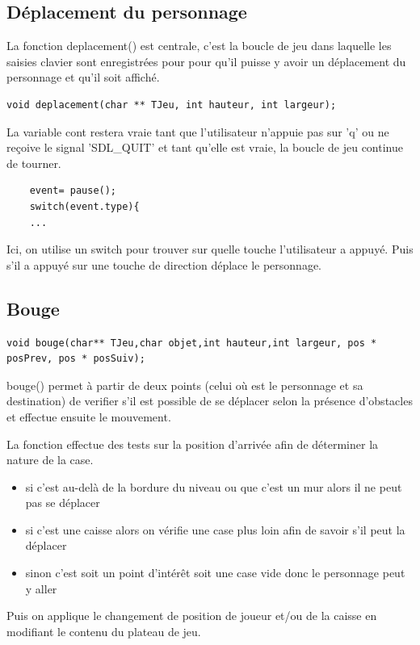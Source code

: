 \documentclass{article}
\begin{document}
\subsection{Déplacement du personnage}

La fonction deplacement() est centrale, c'est la boucle de jeu dans laquelle les saisies clavier sont enregistrées pour pour qu'il puisse y avoir un déplacement du personnage et qu'il soit affiché.
\begin{verbatim}
void deplacement(char ** TJeu, int hauteur, int largeur);
\end{verbatim}
La variable cont restera vraie tant que l'utilisateur n'appuie pas sur 'q' ou  ne reçoive le signal 'SDL\_QUIT' et tant qu'elle est vraie, la boucle de jeu continue de tourner.


\begin{verbatim}
    event= pause();
    switch(event.type){
    ...
\end{verbatim}
Ici, on utilise un switch pour trouver sur quelle touche l'utilisateur a appuyé.
Puis s'il a appuyé sur une touche de direction déplace le personnage.

\subsection{Bouge}

\begin{verbatim}
void bouge(char** TJeu,char objet,int hauteur,int largeur, pos * posPrev, pos * posSuiv);
\end{verbatim}

bouge() permet à partir de deux points (celui où est le personnage et sa destination) de verifier s'il est possible de se déplacer selon la présence d'obstacles et effectue ensuite le mouvement.

La fonction effectue des tests sur la position d'arrivée afin de déterminer la nature de la case.
\begin{itemize}
  \item si c'est au-delà de la bordure du niveau ou que c'est un mur alors il ne peut pas se déplacer
  \item si c'est une caisse alors on vérifie une case plus loin afin de savoir s'il peut la déplacer
  \item sinon c'est soit un point d'intérêt soit une case vide donc le personnage peut y aller
\end{itemize}
Puis on applique le changement de position de joueur et/ou de la caisse en modifiant le contenu du plateau de jeu.
\end{document}
